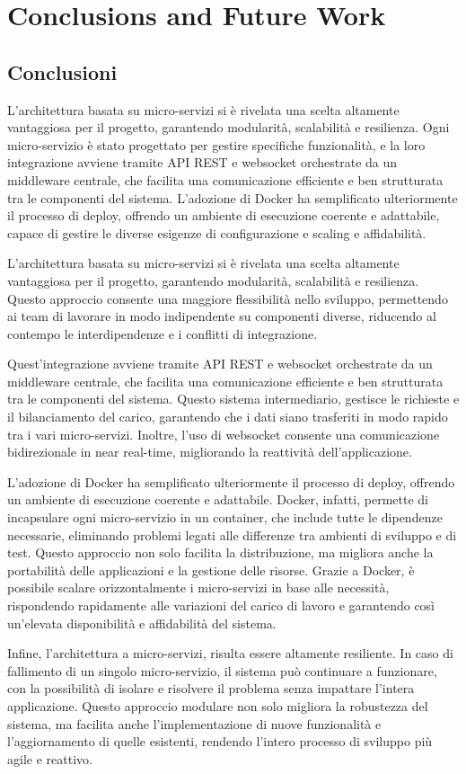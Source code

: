 \chapter{Conclusions and Future Work}
\label{ch:con}
\section{Conclusioni}
L'architettura basata su micro-servizi si è rivelata una scelta altamente vantaggiosa per il progetto,
 garantendo modularità, scalabilità e resilienza. Ogni micro-servizio è stato progettato per gestire specifiche
  funzionalità, e la loro integrazione avviene tramite API REST e websocket orchestrate da un middleware centrale, che facilita
   una comunicazione efficiente e ben strutturata tra le componenti del sistema. L'adozione di Docker ha semplificato
    ulteriormente il processo di deploy, offrendo un ambiente di esecuzione coerente e adattabile, capace di gestire le
     diverse esigenze di configurazione e scaling e affidabilità.

L'architettura basata su micro-servizi si è rivelata una scelta altamente vantaggiosa per il progetto,
 garantendo modularità, scalabilità e resilienza. 
  Questo approccio consente una maggiore flessibilità nello sviluppo,
permettendo ai team di lavorare in modo indipendente su componenti diverse, riducendo al contempo le interdipendenze
 e i conflitti di integrazione.

Quest'integrazione avviene tramite API REST e websocket orchestrate da un middleware centrale, che facilita una 
comunicazione efficiente e ben strutturata tra le componenti del sistema. Questo sistema intermediario,
 gestisce le richieste e il bilanciamento del carico, garantendo che i dati siano trasferiti in modo rapido
 tra i vari micro-servizi. Inoltre, l'uso di websocket consente una comunicazione bidirezionale in near real-time,
  migliorando la reattività dell'applicazione.

L'adozione di Docker ha semplificato ulteriormente il processo di deploy, offrendo un ambiente di esecuzione coerente
 e adattabile. Docker, infatti, permette di incapsulare ogni micro-servizio in un container, che include tutte le
  dipendenze necessarie, eliminando problemi legati alle differenze tra ambienti di sviluppo e di test.
Questo approccio non solo facilita la distribuzione, ma migliora anche la portabilità delle applicazioni e la gestione
 delle risorse. Grazie a Docker, è possibile scalare orizzontalmente i micro-servizi in base alle necessità,
 rispondendo rapidamente alle variazioni del carico di lavoro e garantendo così un'elevata disponibilità e affidabilità del sistema.

Infine, l'architettura a micro-servizi, risulta essere altamente resiliente. In caso di fallimento di un singolo micro-servizio,
 il sistema può continuare a funzionare, con la possibilità di isolare e risolvere il problema senza impattare l'intera
  applicazione. Questo approccio modulare non solo migliora la robustezza del sistema, ma facilita anche l'implementazione
   di nuove funzionalità e l'aggiornamento di quelle esistenti, rendendo l'intero processo di sviluppo più agile e
    reattivo.